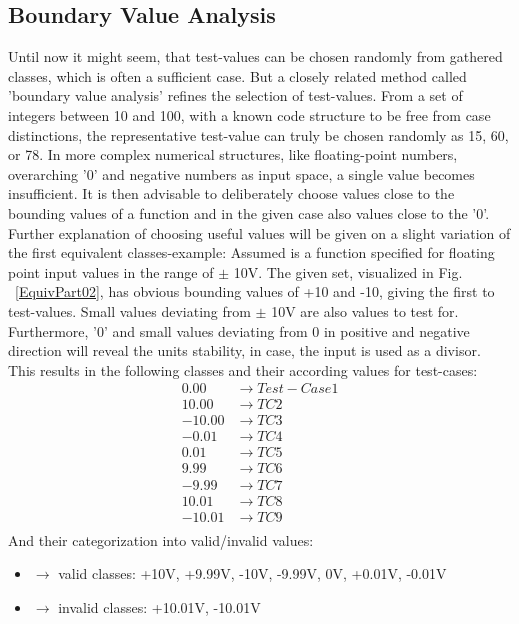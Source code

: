 	\subsection{Boundary Value Analysis} %
	Until now it might seem, that test-values can be chosen randomly from gathered classes, which is often a sufficient case. But a closely related method called 'boundary value analysis' refines the selection of test-values. From a set of integers between 10 and 100, with a known code structure to be free from case distinctions, the representative test-value can truly be chosen randomly as 15, 60, or 78. In more complex numerical structures, like floating-point numbers, overarching '0' and negative numbers as input space, a single value becomes insufficient. It is then advisable to deliberately choose values close to the bounding values of a function and in the given case also values close to the '0'.
	Further explanation of choosing useful values will be given on a slight variation of the first equivalent classes-example: Assumed is a function specified for floating point input values in the range of $\pm$ 10V. 
	The given set, visualized in Fig. ~\ref{EquivPart02}, has obvious bounding values of +10 and -10, giving the first to test-values. Small values deviating from $\pm$ 10V are also values to test for. Furthermore, '0' and small values deviating from 0 in positive and negative direction will reveal the units stability, in case, the input is used as a divisor. \\
	This results in the following classes and their according values for test-cases:
	\begin{align*} %
	0.00		& \rightarrow   Test-Case 1		 \\
	10.00		& \rightarrow   TC2	 \\
	-10.00		& \rightarrow   TC3	 \\
	-0.01		& \rightarrow   TC4	 \\
	0.01		& \rightarrow   TC5	 \\
	9.99		& \rightarrow   TC6	 \\
	-9.99		& \rightarrow   TC7	 \\
	10.01		& \rightarrow   TC8	 \\
	-10.01		& \rightarrow   TC9	 \\
	\end{align*}
	And their categorization into valid/invalid values:
	\begin{itemize}[label={}]
		\item	$\rightarrow$ valid classes: +10V, +9.99V, -10V, -9.99V, 0V, +0.01V, -0.01V \\
		\item	$\rightarrow$ invalid classes: +10.01V, -10.01V \\
	\end{itemize}


